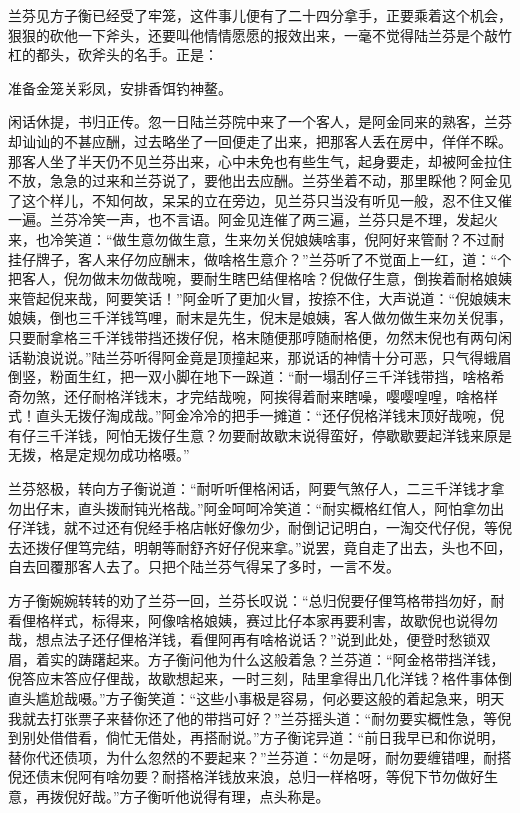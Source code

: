 \documentclass[12pt,UTF8]{ctexbook}
\begin{document}
{{{兰芬见方子衡已经受了牢笼，这件事儿便有了二十四分拿手，正要乘着这个机会，狠狠的砍他一下斧头，还要叫他情情愿愿的报效出来，一毫不觉得陆兰芬是个敲竹杠的都头，砍斧头的名手。正是：

准备金笼关彩凤，安排香饵钓神鳌。

闲话休提，书归正传。忽一日陆兰芬院中来了一个客人，是阿金同来的熟客，兰芬却讪讪的不甚应酬，过去略坐了一回便走了出来，把那客人丢在房中，佯佯不睬。那客人坐了半天仍不见兰芬出来，心中未免也有些生气，起身要走，却被阿金拉住不放，急急的过来和兰芬说了，要他出去应酬。兰芬坐着不动，那里睬他？阿金见了这个样儿，不知何故，呆呆的立在旁边，见兰芬只当没有听见一般，忍不住又催一遍。兰芬冷笑一声，也不言语。阿金见连催了两三遍，兰芬只是不理，发起火来，也冷笑道：“做生意勿做生意，生来勿关倪娘姨啥事，倪阿好来管耐？不过耐挂仔牌子，客人来仔勿应酬末，做啥格生意介？”兰芬听了不觉面上一红，道：“个把客人，倪勿做末勿做哉啘，要耐生瞎巴结俚格啥？倪做仔生意，倒挨着耐格娘姨来管起倪来哉，阿要笑话！”阿金听了更加火冒，按捺不住，大声说道：“倪娘姨末娘姨，倒也三千洋钱笃哩，耐末是先生，倪末是娘姨，客人做勿做生来勿关倪事，只要耐拿格三千洋钱带挡还拨仔倪，格末随便那哼随耐格便，勿然末倪也有两句闲话勒浪说说。”陆兰芬听得阿金竟是顶撞起来，那说话的神情十分可恶，只气得蛾眉倒竖，粉面生红，把一双小脚在地下一跺道：“耐一塌刮仔三千洋钱带挡，啥格希奇勿煞，还仔耐格洋钱末，才完结哉啘，阿挨得着耐来瞎噪，嘤嘤喤喤，啥格样式！直头无拨仔淘成哉。”阿金冷冷的把手一摊道：“还仔倪格洋钱末顶好哉啘，倪有仔三千洋钱，阿怕无拨仔生意？勿要耐故歇末说得蛮好，停歇歇要起洋钱来原是无拨，格是定规勿成功格嗫。”

兰芬怒极，转向方子衡说道：“耐听听俚格闲话，阿要气煞仔人，二三千洋钱才拿勿出仔末，直头拨耐钝光格哉。”阿金呵呵冷笑道：“耐实概格红倌人，阿怕拿勿出仔洋钱，就不过还有倪经手格店帐好像勿少，耐倒记记明白，一淘交代仔倪，等倪去还拨仔俚笃完结，明朝等耐舒齐好仔倪来拿。”说罢，竟自走了出去，头也不回，自去回覆那客人去了。只把个陆兰芬气得呆了多时，一言不发。

方子衡婉婉转转的劝了兰芬一回，兰芬长叹说：“总归倪要仔俚笃格带挡勿好，耐看俚格样式，标得来，阿像啥格娘姨，赛过比仔本家再要利害，故歇倪也说得勿哉，想点法子还仔俚格洋钱，看俚阿再有啥格说话？”说到此处，便登时愁锁双眉，着实的踌躇起来。方子衡问他为什么这般着急？兰芬道：“阿金格带挡洋钱，倪答应末答应仔俚哉，故歇想起来，一时三刻，陆里拿得出几化洋钱？格件事体倒直头尴尬哉嗫。”方子衡笑道：“这些小事极是容易，何必要这般的着起急来，明天我就去打张票子来替你还了他的带挡可好？”兰芬摇头道：“耐勿要实概性急，等倪到别处借借看，倘忙无借处，再搭耐说。”方子衡诧异道：“前日我早已和你说明，替你代还债项，为什么忽然的不要起来？”兰芬道：“勿是呀，耐勿要缠错哩，耐搭倪还债末倪阿有啥勿要？耐搭格洋钱放来浪，总归一样格呀，等倪下节勿做好生意，再拨倪好哉。”方子衡听他说得有理，点头称是。

}}}
\end{document}

